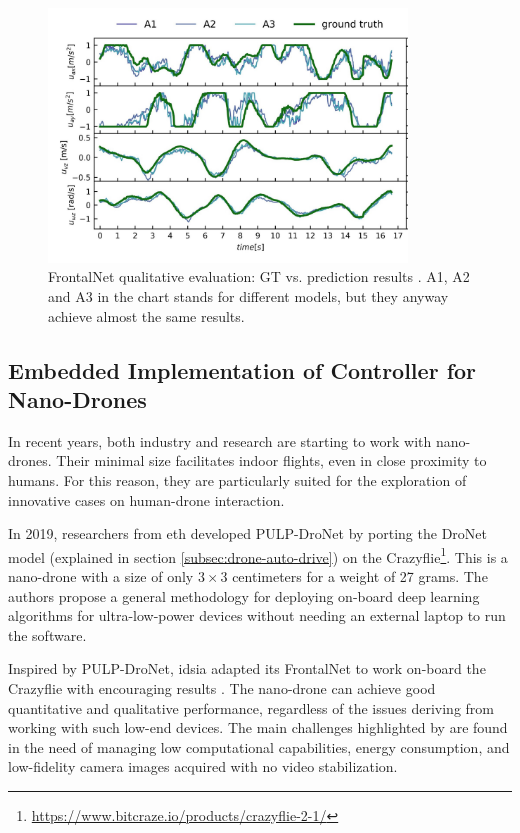 \begin{figure}[!htb]
	\centering
	\includegraphics[width=0.85\textwidth]{"contents/images/03-frontalnet-gt-pred-2"}
	\caption[FrontalNet qualitative evaluation: GT vs. prediction results \cite{mantegazza2019visionbased}]{FrontalNet qualitative evaluation: GT vs. prediction results \cite{mantegazza2019visionbased}. A1, A2 and A3 in the chart stands for different models, but they anyway achieve almost the same results.}
	\label{fig:frontalnet-gt-pred}
\end{figure}


\subsection{Embedded Implementation of Controller for Nano-Drones}
\label{subsec:sota-nicky}

In recent years, both industry and research are starting to work with nano-drones. Their minimal size facilitates indoor flights, even in close proximity to humans. For this reason, they are particularly suited for the exploration of innovative cases on human-drone interaction.

\medskip

In 2019, researchers from \gls{eth} developed PULP-DroNet \cite{palossi2019pulpdronetIoTJ} by porting the DroNet \cite{Loquercio_2018} model (explained in section \ref{subsec:drone-auto-drive}) on the Crazyflie\footnote{\url{https://www.bitcraze.io/products/crazyflie-2-1/}}. This is a nano-drone with a size of only $3 \times 3$ centimeters for a weight of 27 grams. The authors propose a general methodology for deploying on-board deep learning algorithms for ultra-low-power devices without needing an external laptop to run the software.

Inspired by PULP-DroNet, \gls{idsia} adapted its FrontalNet \cite{mantegazza2019visionbased} to work on-board the Crazyflie with encouraging results \cite{zimmerman2020thesis}. The nano-drone can achieve good quantitative and qualitative performance, regardless of the issues deriving from working with such low-end devices. The main challenges highlighted by \cite{zimmerman2020thesis} are found in the need of managing low computational capabilities, energy consumption, and low-fidelity camera images acquired with no video stabilization.




